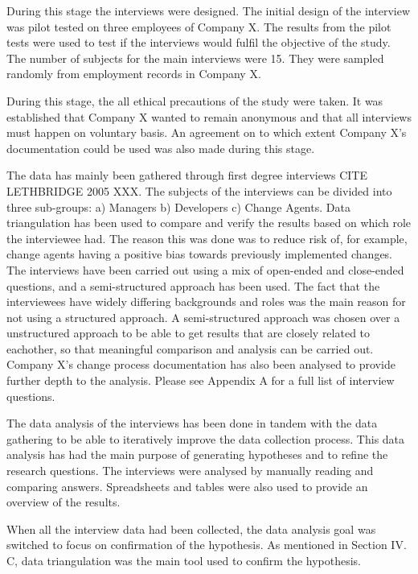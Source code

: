 \documentclass[times, 10pt,twocolumn]{Article}
\begin{document}
During this stage the interviews were designed. The initial design of the interview was pilot tested on three employees of Company X. The results from the pilot tests were used to test if the interviews would fulfil the objective of the study. The number of subjects for the main interviews were 15. They were sampled randomly from employment records in Company X. 

During this stage, the all ethical precautions of the study were taken. It was established that Company X wanted to remain anonymous and that all interviews must happen on voluntary basis. An agreement on to which extent Company X's documentation could be used was also made during this stage. 

The data has mainly been gathered through first degree interviews CITE LETHBRIDGE 2005 XXX. The subjects of the interviews can be divided into three sub-groups: a) Managers b) Developers c) Change Agents. Data triangulation has been used to compare and verify the results based on which role the interviewee had. The reason this was done was to reduce risk of, for example, change agents having a positive bias towards previously implemented changes. The interviews have been carried out using a mix of open-ended and close-ended questions, and a semi-structured approach has been used. The fact that the interviewees have widely differing backgrounds and roles was the main reason for not using a structured approach. A semi-structured approach was chosen over a unstructured approach to be able to get results that are closely related to eachother, so that meaningful comparison and analysis can be carried out. Company X's change process documentation has also been analysed to provide further depth to the analysis. Please see Appendix A for a full list of interview questions.

The data analysis of the interviews has been done in tandem with the data gathering to be able to iteratively improve the data collection process. This data analysis has had the main purpose of generating hypotheses and to refine the research questions. The interviews were analysed by manually reading and comparing answers. Spreadsheets and tables were also used to provide an overview of the results. 

When all the interview data had been collected, the data analysis goal was switched to focus on confirmation of the hypothesis. As mentioned in Section IV. C, data triangulation was the main tool used to confirm the hypothesis. 
\end{document}
